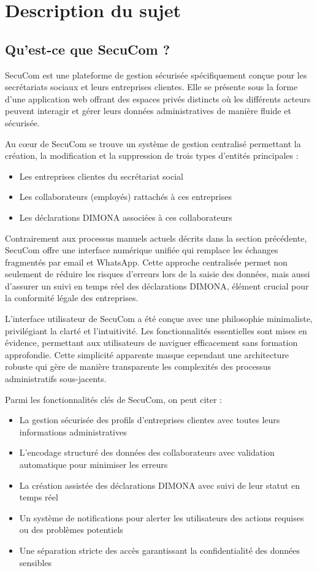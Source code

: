 \chapter{Description du sujet}

\section{Qu'est-ce que SecuCom ?}

SecuCom est une plateforme de gestion sécurisée spécifiquement conçue pour les secrétariats sociaux et leurs entreprises clientes. Elle se présente sous la forme d'une application web offrant des espaces privés distincts où les différents acteurs peuvent interagir et gérer leurs données administratives de manière fluide et sécurisée.

Au cœur de SecuCom se trouve un système de gestion centralisé permettant la création, la modification et la suppression de trois types d'entités principales :
\begin{itemize}
  \item Les entreprises clientes du secrétariat social
  \item Les collaborateurs (employés) rattachés à ces entreprises
  \item Les déclarations DIMONA associées à ces collaborateurs
\end{itemize}

Contrairement aux processus manuels actuels décrits dans la section précédente, SecuCom offre une interface numérique unifiée qui remplace les échanges fragmentés par email et WhatsApp. Cette approche centralisée permet non seulement de réduire les risques d'erreurs lors de la saisie des données, mais aussi d'assurer un suivi en temps réel des déclarations DIMONA, élément crucial pour la conformité légale des entreprises.

L'interface utilisateur de SecuCom a été conçue avec une philosophie minimaliste, privilégiant la clarté et l'intuitivité. Les fonctionnalités essentielles sont mises en évidence, permettant aux utilisateurs de naviguer efficacement sans formation approfondie. Cette simplicité apparente masque cependant une architecture robuste qui gère de manière transparente les complexités des processus administratifs sous-jacents.

Parmi les fonctionnalités clés de SecuCom, on peut citer :

\begin{itemize}
  \item La gestion sécurisée des profils d'entreprises clientes avec toutes leurs informations administratives
  \item L'encodage structuré des données des collaborateurs avec validation automatique pour minimiser les erreurs
  \item La création assistée des déclarations DIMONA avec suivi de leur statut en temps réel
  \item Un système de notifications pour alerter les utilisateurs des actions requises ou des problèmes potentiels
  \item Une séparation stricte des accès garantissant la confidentialité des données sensibles
\end{itemize}

